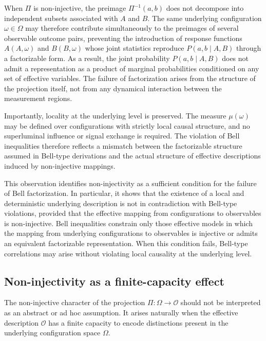   When $\Pi$ is non-injective, the preimage $\Pi^{-1}(a,b)$ does not decompose into
  independent subsets associated with $A$ and $B$.
  The same underlying configuration $\omega \in \Omega$ may therefore
  contribute simultaneously to the preimages of several observable
  outcome pairs, preventing the introduction of response functions
  $A(A,\omega)$ and $B(B,\omega)$ whose joint statistics reproduce
  $P(a,b\mid A,B)$ through a factorizable form.
  As a result, the joint probability $P(a,b \mid A,B)$ does not admit a representation
  as a product of marginal probabilities conditioned on any set of effective variables.
  The failure of factorization arises from the structure of the projection itself,
  not from any dynamical interaction between the measurement regions.

  Importantly, locality at the underlying level is preserved.
  The measure $\mu(\omega)$ may be defined over configurations with strictly local
  causal structure, and no superluminal influence or signal exchange is required.
  The violation of Bell inequalities therefore reflects a mismatch between the
  factorizable structure assumed in Bell-type derivations and the actual structure
  of effective descriptions induced by non-injective mappings.

  This observation identifies non-injectivity as a sufficient condition for the
  failure of Bell factorization.
  In particular, it shows that the existence of a local and deterministic underlying
  description is not in contradiction with Bell-type violations, provided that the
  effective mapping from configurations to observables is non-injective.
  Bell inequalities constrain only those effective models in which the mapping
  from underlying configurations to observables is injective or admits an equivalent
  factorizable representation.
  When this condition fails, Bell-type correlations may arise without violating
  local causality at the underlying level.

  \subsection*{Non-injectivity as a finite-capacity effect}

    The non-injective character of the projection
    $\Pi : \Omega \to \mathcal{O}$ should not be interpreted as an abstract or ad hoc assumption.
    It arises naturally when the effective description $\mathcal{O}$ has a finite
    capacity to encode distinctions present in the underlying configuration space $\Omega$.

